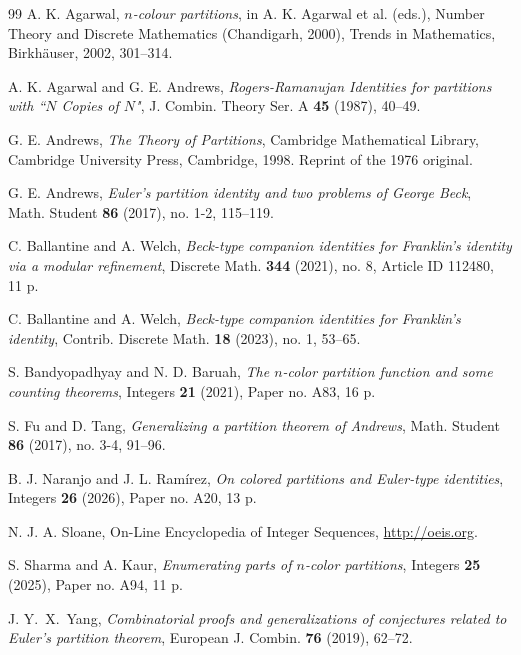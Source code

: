 \documentclass[reqno,12pt]{amsart}
\theoremstyle{definition}
\begin{document}
\begin{thebibliography}{99}
 A. K. Agarwal, 
\textit{$n$-colour partitions}, 
in A. K. Agarwal et al. (eds.), Number Theory and Discrete Mathematics (Chandigarh, 2000), Trends in Mathematics, Birkhäuser, 2002, 301--314.

 A. K. Agarwal and G. E. Andrews, 
\textit{Rogers-Ramanujan Identities for partitions with ``$N$ Copies of $N$"},  
J. Combin. Theory Ser. A \textbf{45} (1987), 40--49.

 G. E. Andrews, 
\textit{The Theory of Partitions}, Cambridge Mathematical Library, Cambridge
University Press, Cambridge, 1998. Reprint of the 1976 original.

 G. E. Andrews, 
\textit{Euler's partition identity and two problems of George Beck}, 
Math. Student \textbf{86} (2017), no. 1-2, 115--119.

 C. Ballantine and A. Welch,
\textit{Beck-type companion identities for Franklin's identity via a modular refinement},
Discrete Math. \textbf{344} (2021), no. 8, Article ID 112480, 11 p. 

 C. Ballantine and A. Welch,
\textit{Beck-type companion identities for Franklin's identity},
Contrib. Discrete Math. \textbf{18} (2023), no. 1, 53--65. 

 S. Bandyopadhyay and N. D. Baruah, 
\textit{The $n$-color partition function and some counting theorems},
Integers \textbf{21} (2021), Paper no. A83, 16 p. 

 S. Fu and D. Tang,  
\textit{Generalizing a partition theorem of Andrews},
Math. Student \textbf{86} (2017), no. 3-4, 91--96.

 B. J. Naranjo and J. L.  Ramírez, 
\textit{On colored partitions and Euler-type identities}, 
Integers \textbf{26} (2026), Paper no. A20, 13 p. 

N. J. A. Sloane, On-Line Encyclopedia of Integer Sequences, \url{http://oeis.org}.

 S. Sharma and A. Kaur, 
\textit{Enumerating parts of $n$-color partitions},
Integers \textbf{25} (2025), Paper no. A94, 11 p.

 J. Y.~X.~Yang, 
\textit{Combinatorial proofs and generalizations of conjectures related to Euler's partition theorem},  
European J. Combin. \textbf{76} (2019), 62--72.

\end{thebibliography}
\end{document}
